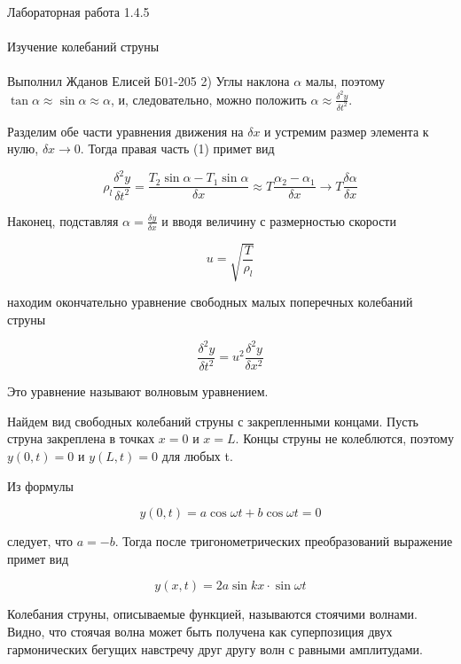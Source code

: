 \documentclass{astroedu-lab}
\begin{document}
\begin{problem}{\huge Лабораторная работа 1.4.5\\\\Изучение колебаний струны\\\\Выполнил Жданов Елисей Б01-205}
2) Углы наклона $\alpha$ малы, поэтому $\tan{\alpha} \approx \sin{\alpha} \approx \alpha$, и, следовательно, можно положить $\alpha \approx \frac{\delta^2 y}{\delta t^2}$.

Разделим обе части уравнения движения на $\delta x$ и устремим размер элемента к нулю, $\delta x \rightarrow 0$. Тогда правая часть (1) примет вид

\begin{equation}
	\rho_l \frac{\delta^2 y}{\delta t^2} = \frac{T_2 \sin{\alpha} - T_1 \sin{\alpha}}{\delta x} \approx T \frac{\alpha_2 - \alpha_1}{\delta x} \rightarrow T \frac{\delta \alpha}{\delta x}
\end{equation}

Наконец, подставляя $\alpha = \frac{\delta y}{\delta x}$ и вводя величину с размерностью скорости

\begin{equation}
	\boxed{u = \sqrt{\frac{T}{\rho_l}}}
\end{equation}

находим окончательно уравнение свободных малых поперечных колебаний
струны

\begin{equation}
	\frac{\delta^2 y}{\delta t^2} = u^2 \frac{\delta^2 y}{\delta x^2}
\end{equation}

Это уравнение называют волновым уравнением.

Найдем вид свободных колебаний струны с закрепленными концами.
Пусть струна закреплена в точках $x = 0$ и $x = L$. Концы струны не колеблются, поэтому $y(0, t) = 0$ и $y(L, t) = 0$ для любых t.

Из формулы

\begin{equation}
	y(0, t) = a \cos{\omega t} + b \cos{\omega t} = 0
\end{equation}

следует, что $a = -b$. Тогда после тригонометрических преобразований выражение примет вид

\begin{equation}
	y(x, t) = 2 a \sin{k x} \cdot \sin{\omega t}
\end{equation}

Колебания струны, описываемые функцией, называются стоячими волнами. Видно, что стоячая волна может быть получена как суперпозиция двух гармонических бегущих навстречу друг другу волн с равными амплитудами.


\end{problem}
\end{document}
